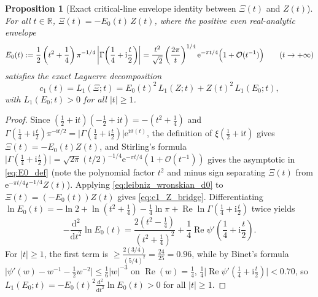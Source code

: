 \documentclass[11pt,reqno]{amsart}
\newtheorem{proposition}[theorem]{Proposition}
\theoremstyle{definition}
\theoremstyle{remark}
\numberwithin{equation}{section}
\newcommand{\ii}{\mathrm{i}}
\newcommand{\ee}{\mathrm{e}}
\newcommand{\dd}{\mathrm{d}}
\newcommand{\Rea}{\operatorname{Re}}
\begin{document}
\begin{proposition}[Exact critical-line envelope identity between $\Xi(t)$ and $Z(t)$]\label{prop:stirling_bridge}
For all $t \in \mathbb{R}$, $\Xi(t) = -E_0(t)\,Z(t)$, where the positive even real-analytic envelope
\begin{equation}\label{eq:E0_def}
  E_0(t) := \frac{1}{2}\left(t^2 + \frac{1}{4}\right)\pi^{-1/4}\left\lvert\Gamma\!\left(\frac{1}{4} + \ii\frac{t}{2}\right)\right\rvert
  = \frac{t^2}{\sqrt{2}}\left(\frac{2\pi}{t}\right)^{1/4}\ee^{-\pi t/4}\Bigl(1 + \mathcal{O}(t^{-1})\Bigr) \qquad (t \to +\infty)
\end{equation}
satisfies the exact Laguerre decomposition
\begin{equation}\label{eq:c1_Z_bridge}
  c_1(t) = L_1(\Xi; t) = E_0(t)^2\,L_1(Z; t) + Z(t)^2\,L_1(E_0; t),
\end{equation}
with $L_1(E_0; t) > 0$ for all $\lvert t\rvert \ge 1$.
\end{proposition}

\begin{proof}
Since $(\frac{1}{2}+\ii t)(-\frac{1}{2}+\ii t) = -(t^2 + \frac{1}{4})$ and $\Gamma(\frac{1}{4}+\ii\frac{t}{2})\pi^{-\ii t/2} = \lvert\Gamma(\frac{1}{4}+\ii\frac{t}{2})\rvert\ee^{\ii\vartheta(t)}$, the definition of $\xi(\frac{1}{2}+\ii t)$ gives $\Xi(t) = -E_0(t)Z(t)$, and Stirling's formula $\lvert\Gamma(\frac{1}{4}+\ii\frac{t}{2})\rvert = \sqrt{2\pi}(t/2)^{-1/4}\ee^{-\pi t/4}(1 + \mathcal{O}(t^{-1}))$ gives the asymptotic in \eqref{eq:E0_def} (note the polynomial factor $t^2$ and minus sign separating $\Xi(t)$ from $\ee^{-\pi t/4}t^{-1/4}Z(t)$). Applying \eqref{eq:leibniz_wronskian_d0} to $\Xi(t) = (-E_0(t))Z(t)$ gives \eqref{eq:c1_Z_bridge}. Differentiating $\ln E_0(t) = -\ln 2 + \ln(t^2+\frac{1}{4}) - \frac{1}{4}\ln\pi + \Rea\ln\Gamma(\frac{1}{4}+\ii\frac{t}{2})$ twice yields
\begin{equation*}
  -\frac{\dd^2}{\dd t^2}\ln E_0(t) = \frac{2(t^2 - \frac{1}{4})}{(t^2 + \frac{1}{4})^2} + \frac{1}{4}\Rea\psi'\!\left(\frac{1}{4} + \ii\frac{t}{2}\right).
\end{equation*}
For $\lvert t\rvert \ge 1$, the first term is $\ge \frac{2(3/4)}{(5/4)^2} = \frac{24}{25} = 0.96$, while by Binet's formula $\lvert\psi'(w) - w^{-1} - \frac{1}{2}w^{-2}\rvert \le \frac{1}{6}\lvert w\rvert^{-3}$ on $\Rea(w) = \frac{1}{4}$, $\frac{1}{4}\lvert\Rea\psi'(\frac{1}{4}+\ii\frac{t}{2})\rvert < 0.70$, so $L_1(E_0; t) = -E_0(t)^2\frac{\dd^2}{\dd t^2}\ln E_0(t) > 0$ for all $\lvert t\rvert \ge 1$.
\end{proof}
\end{document}
